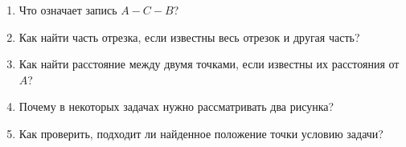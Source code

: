 \begin{questionsbox}
  \begin{enumerate}
    \item Что означает запись \(A-C-B\)?
    \item Как найти часть отрезка, если известны весь отрезок и другая часть?
    \item Как найти расстояние между двумя точками, если известны их расстояния от \(A\)?
    \item Почему в некоторых задачах нужно рассматривать два рисунка?
    \item Как проверить, подходит ли найденное положение точки условию задачи?
  \end{enumerate}
\end{questionsbox}
